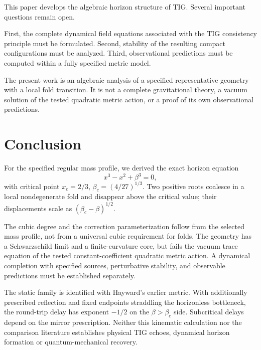 \documentclass[11pt,a4paper]{article}
\begin{document}
This paper develops the algebraic horizon structure of TIG. Several important
questions remain open.

First, the complete dynamical field equations associated with the TIG
consistency principle must be formulated. Second, stability of the resulting
compact configurations must be analyzed. Third, observational predictions must
be computed within a fully specified metric model.

The present work is an algebraic analysis of a specified representative
geometry with a local fold transition. It is not a complete gravitational
theory, a vacuum solution of the tested quadratic metric action, or a proof of
its own observational predictions.

\section{Conclusion}

For the specified regular mass profile, we derived the exact horizon equation
\begin{equation}
x^3-x^2+\beta^3=0,
\end{equation}
with critical point \(x_c=2/3\), \(\beta_c=(4/27)^{1/3}\). Two positive roots
coalesce in a local nondegenerate fold and disappear above the critical value;
their displacements scale as \((\beta_c-\beta)^{1/2}\).

The cubic degree and the correction parameterization follow from the selected
mass profile, not from a universal cubic requirement for folds. The geometry
has a Schwarzschild limit and a finite-curvature core, but fails the vacuum
trace equation of the tested constant-coefficient quadratic metric action.
A dynamical completion with specified sources, perturbative stability, and
observable predictions must be established separately.


The static family is identified with Hayward's earlier metric. With additionally
prescribed reflection and fixed endpoints straddling the horizonless bottleneck,
the round-trip delay has exponent $-1/2$ on the $\beta>\beta_c$ side.
Subcritical delays depend on the mirror prescription. Neither this kinematic
calculation nor the comparison literature establishes physical TIG echoes,
dynamical horizon formation or quantum-mechanical recovery.
\end{document}
